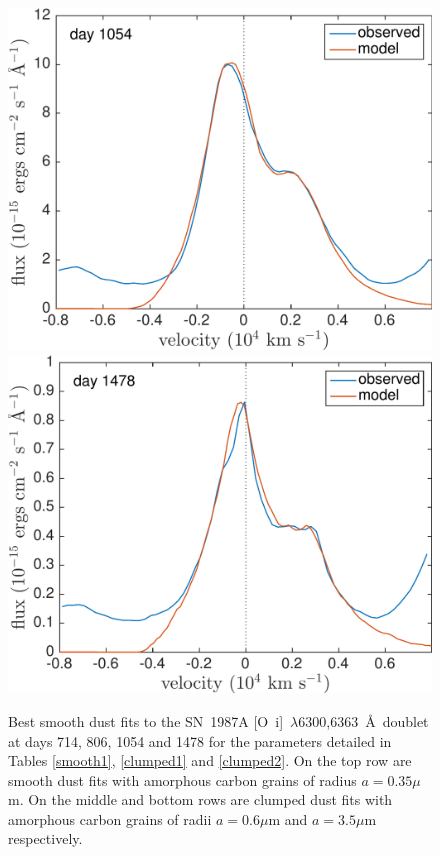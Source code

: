 \begin{figure}
\includegraphics[trim =0 25 0 0,clip=true,scale=0.4]{chapters/chapter5/images/clump_1/maximum/d1054OI.pdf}
\hspace{1mm}
\includegraphics[trim =25 25 0 0,clip=true,scale=0.4]{chapters/chapter5/images/clump_1/maximum/d1478OI_new.pdf}


\caption{Best smooth dust fits to the SN~1987A [O~{\sc i}]~$\lambda$6300,6363~\AA\ doublet at days 714, 806, 1054 and 1478 for the parameters detailed in Tables \ref{smooth1}, \ref{clumped1} and \ref{clumped2}.  On the top row are smooth dust fits with amorphous carbon grains of radius $a=0.35 \mu$m.  On the middle and bottom rows are clumped dust fits with amorphous carbon grains of radii $a=0.6 \mu$m and $a=3.5 \mu$m respectively.}
\label{OI_smooth}

\end{figure}


